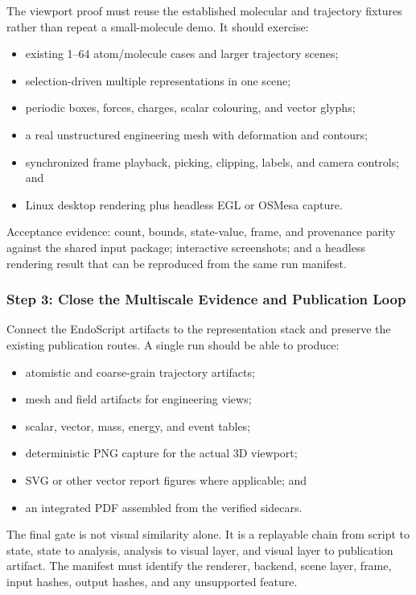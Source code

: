 \documentclass[11pt,a4paper]{article}
\begin{document}
The viewport proof must reuse the established molecular and trajectory
fixtures rather than repeat a small-molecule demo.  It should exercise:

\begin{itemize}
  \item existing 1--64 atom/molecule cases and larger trajectory scenes;
  \item selection-driven multiple representations in one scene;
  \item periodic boxes, forces, charges, scalar colouring, and vector glyphs;
  \item a real unstructured engineering mesh with deformation and contours;
  \item synchronized frame playback, picking, clipping, labels, and camera
        controls; and
  \item Linux desktop rendering plus headless EGL or OSMesa capture.
\end{itemize}

Acceptance evidence: count, bounds, state-value, frame, and provenance parity
against the shared input package; interactive screenshots; and a headless
rendering result that can be reproduced from the same run manifest.

\subsubsection{Step 3: Close the Multiscale Evidence and Publication Loop}

Connect the EndoScript artifacts to the representation stack and preserve the
existing publication routes.  A single run should be able to produce:

\begin{itemize}
  \item atomistic and coarse-grain trajectory artifacts;
  \item mesh and field artifacts for engineering views;
  \item scalar, vector, mass, energy, and event tables;
  \item deterministic PNG capture for the actual 3D viewport;
  \item SVG or other vector report figures where applicable; and
  \item an integrated PDF assembled from the verified sidecars.
\end{itemize}

The final gate is not visual similarity alone.  It is a replayable chain from
script to state, state to analysis, analysis to visual layer, and visual layer
to publication artifact.  The manifest must identify the renderer, backend,
scene layer, frame, input hashes, output hashes, and any unsupported feature.
\end{document}
